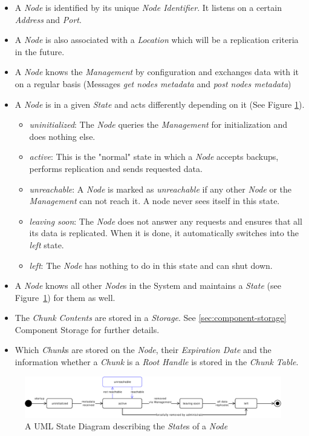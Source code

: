 \begin{itemize}
    \item A \emph{Node} is identified by its unique \emph{Node Identifier}. It listens on a certain \emph{Address} and \emph{Port}.
    \item A \emph{Node} is also associated with a \emph{Location} which will be a replication criteria in the future.
    \item A \emph{Node} knows the \emph{Management} by configuration and exchanges data with it on a regular basis (Messages \emph{get nodes metadata} and \emph{post nodes metadata})
    \item A \emph{Node} is in a given \emph{State} and acts differently depending on it (See Figure \ref{fig:node-states}).
    \begin{itemize}
        \item \emph{uninitialized}: The \emph{Node} queries the \emph{Management} for initialization and does nothing else.
        \item \emph{active}: This is the "normal" state in which a \emph{Node} accepts backups, performs replication and sends requested data.
        \item \emph{unreachable}: A \emph{Node} is marked as \emph{unreachable} if any other \emph{Node} or the \emph{Management} can not reach it. A node never sees itself in this state.
        \item  \emph{leaving soon}: The \emph{Node} does not answer any requests and ensures that all its data is replicated. When it is done, it automatically switches into the \emph{left} state.
        \item \emph{left}: The \emph{Node} has nothing to do in this state and can shut down.
    \end{itemize}
    \item A \emph{Node} knows all other \emph{Node}s in the System and maintains a \emph{State} (see Figure~\ref{fig:node-states}) for them as well.
    \item The \emph{Chunk Contents} are stored in a \emph{Storage}. See \ref{sec:component-storage} Component Storage for further details.
    \item Which \emph{Chunk}s are stored on the \emph{Node}, their \emph{Expiration Date} and the information whether a \emph{Chunk} is a \emph{Root Handle} is stored in the \emph{Chunk Table}.
\end{itemize}

\begin{figure}[h]
    \centering
    \includegraphics[width=1\linewidth]{resources/node_state}
    \caption[Node States]{A UML State Diagram describing the \emph{State}s of a \emph{Node}}
    \label{fig:node-states}
\end{figure}

